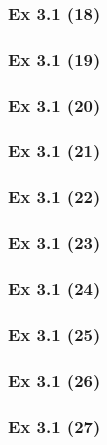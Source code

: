 \subsubsection{Ex 3.1 (18)}\label{sec:Ex_3.1.18}

\subsubsection{Ex 3.1 (19)}\label{sec:Ex_3.1.19}

\subsubsection{Ex 3.1 (20)}\label{sec:Ex_3.1.20}

\newpage		%

\subsubsection{Ex 3.1 (21)}\label{sec:Ex_3.1.21}

\subsubsection{Ex 3.1 (22)}\label{sec:Ex_3.1.22}

\subsubsection{Ex 3.1 (23)}\label{sec:Ex_3.1.23}

\subsubsection{Ex 3.1 (24)}\label{sec:Ex_3.1.24}

\subsubsection{Ex 3.1 (25)}\label{sec:Ex_3.1.25}

\subsubsection{Ex 3.1 (26)}\label{sec:Ex_3.1.26}

\subsubsection{Ex 3.1 (27)}\label{sec:Ex_3.1.27}

